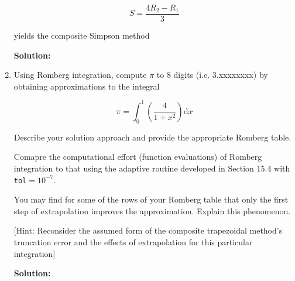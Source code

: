 \documentclass[12pt]{article}
\begin{document}
\begin{enumerate}
\[
S = \frac{4R_{2} - R_{1}}{3}
\]

yields the composite Simpson method

{\bf Solution:}

\item Using Romberg integration, compute $\pi$ to 8 digits (i.e. 3.xxxxxxxx) by obtaining approximations to the integral

\[
\pi = \int_{0}^{1}\left( \frac{4}{1 + x^{2}}\right)\text{d}x
\]

Describe your solution approach and provide the appropriate Romberg table.

Comapre the computational effort (function evaluations) of Romberg integration to that using the adaptive routine developed in Section 15.4 with {\tt tol}$= 10^{-7}$.

You may find for some of the rows of your Romberg table that only the first step of extrapolation improves the approximation. Explain this phenomenon.

[Hint: Reconsider the assumed form of the composite trapezoidal method's truncation error and the effects of extrapolation for this particular integration]

{\bf Solution:}

\end{enumerate}

\end{document}
